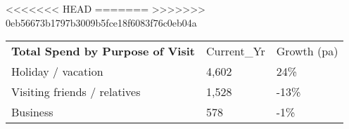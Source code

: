 <<<<<<< HEAD
=======
>>>>>>> 0eb56673b1797b3009b5fce18f6083f76c0eb04a
\begin{tabular}[t]{p{5.4cm}p{0.9cm}p{1.2cm}}
 \textbf{Total Spend by Purpose of Visit} & Current\_Yr & Growth (pa) \\ 
 Holiday / vacation & 4,602 & 24\% \\ 
  Visiting friends / relatives & 1,528 & -13\% \\ 
  Business &   578 & -1\% \\ 
  \end{tabular}
